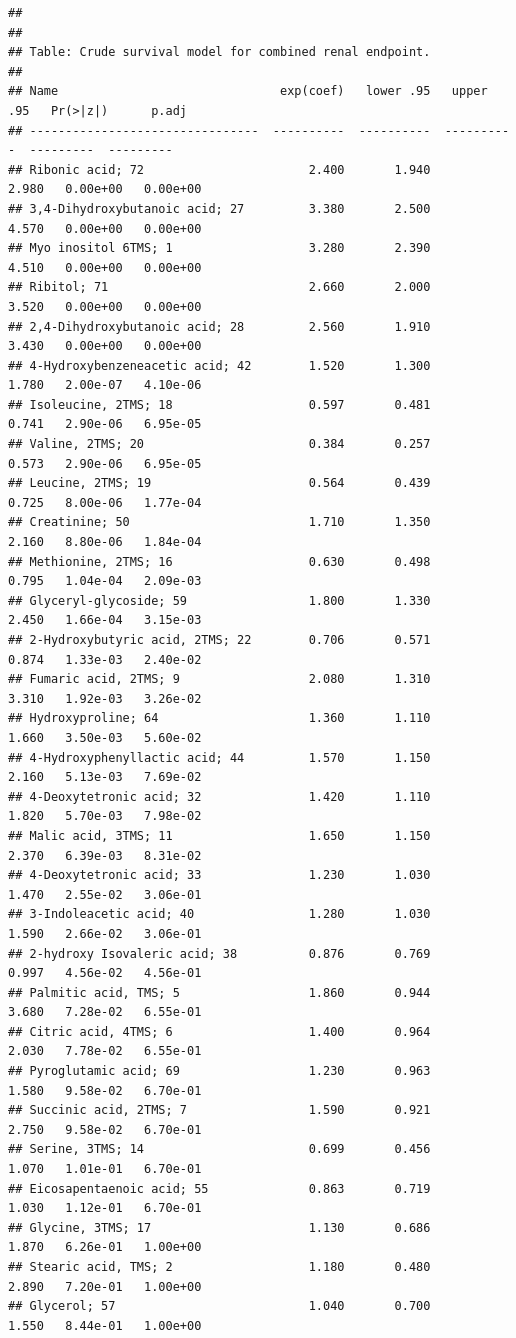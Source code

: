 \documentclass[]{article}
\begin{document}
\begin{verbatim}
## 
## 
## Table: Crude survival model for combined renal endpoint.
## 
## Name                               exp(coef)   lower .95   upper .95   Pr(>|z|)      p.adj
## --------------------------------  ----------  ----------  ----------  ---------  ---------
## Ribonic acid; 72                       2.400       1.940       2.980   0.00e+00   0.00e+00
## 3,4-Dihydroxybutanoic acid; 27         3.380       2.500       4.570   0.00e+00   0.00e+00
## Myo inositol 6TMS; 1                   3.280       2.390       4.510   0.00e+00   0.00e+00
## Ribitol; 71                            2.660       2.000       3.520   0.00e+00   0.00e+00
## 2,4-Dihydroxybutanoic acid; 28         2.560       1.910       3.430   0.00e+00   0.00e+00
## 4-Hydroxybenzeneacetic acid; 42        1.520       1.300       1.780   2.00e-07   4.10e-06
## Isoleucine, 2TMS; 18                   0.597       0.481       0.741   2.90e-06   6.95e-05
## Valine, 2TMS; 20                       0.384       0.257       0.573   2.90e-06   6.95e-05
## Leucine, 2TMS; 19                      0.564       0.439       0.725   8.00e-06   1.77e-04
## Creatinine; 50                         1.710       1.350       2.160   8.80e-06   1.84e-04
## Methionine, 2TMS; 16                   0.630       0.498       0.795   1.04e-04   2.09e-03
## Glyceryl-glycoside; 59                 1.800       1.330       2.450   1.66e-04   3.15e-03
## 2-Hydroxybutyric acid, 2TMS; 22        0.706       0.571       0.874   1.33e-03   2.40e-02
## Fumaric acid, 2TMS; 9                  2.080       1.310       3.310   1.92e-03   3.26e-02
## Hydroxyproline; 64                     1.360       1.110       1.660   3.50e-03   5.60e-02
## 4-Hydroxyphenyllactic acid; 44         1.570       1.150       2.160   5.13e-03   7.69e-02
## 4-Deoxytetronic acid; 32               1.420       1.110       1.820   5.70e-03   7.98e-02
## Malic acid, 3TMS; 11                   1.650       1.150       2.370   6.39e-03   8.31e-02
## 4-Deoxytetronic acid; 33               1.230       1.030       1.470   2.55e-02   3.06e-01
## 3-Indoleacetic acid; 40                1.280       1.030       1.590   2.66e-02   3.06e-01
## 2-hydroxy Isovaleric acid; 38          0.876       0.769       0.997   4.56e-02   4.56e-01
## Palmitic acid, TMS; 5                  1.860       0.944       3.680   7.28e-02   6.55e-01
## Citric acid, 4TMS; 6                   1.400       0.964       2.030   7.78e-02   6.55e-01
## Pyroglutamic acid; 69                  1.230       0.963       1.580   9.58e-02   6.70e-01
## Succinic acid, 2TMS; 7                 1.590       0.921       2.750   9.58e-02   6.70e-01
## Serine, 3TMS; 14                       0.699       0.456       1.070   1.01e-01   6.70e-01
## Eicosapentaenoic acid; 55              0.863       0.719       1.030   1.12e-01   6.70e-01
## Glycine, 3TMS; 17                      1.130       0.686       1.870   6.26e-01   1.00e+00
## Stearic acid, TMS; 2                   1.180       0.480       2.890   7.20e-01   1.00e+00
## Glycerol; 57                           1.040       0.700       1.550   8.44e-01   1.00e+00
\end{verbatim}
\end{document}
